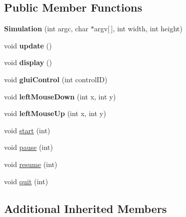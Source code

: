 \subsection*{Public Member Functions}
\begin{DoxyCompactItemize}
\item 
\hypertarget{classSimulation_a4c669ceaa34c7130966ce45f9de75fbe}{{\bfseries Simulation} (int argc, char $\ast$argv\mbox{[}$\,$\mbox{]}, int width, int height)}\label{classSimulation_a4c669ceaa34c7130966ce45f9de75fbe}

\item 
\hypertarget{classSimulation_a05f768b6836615170f1c43c6c0787fe8}{void {\bfseries update} ()}\label{classSimulation_a05f768b6836615170f1c43c6c0787fe8}

\item 
\hypertarget{classSimulation_a449dcb7d97dfba99efe770de2f399c31}{void {\bfseries display} ()}\label{classSimulation_a449dcb7d97dfba99efe770de2f399c31}

\item 
\hypertarget{classSimulation_a1607cd18e552ab9f4a6f57d362f7121a}{void {\bfseries glui\-Control} (int control\-I\-D)}\label{classSimulation_a1607cd18e552ab9f4a6f57d362f7121a}

\item 
\hypertarget{classSimulation_a786d1ba31d29937f0ac6f3ea88f8a607}{void {\bfseries left\-Mouse\-Down} (int x, int y)}\label{classSimulation_a786d1ba31d29937f0ac6f3ea88f8a607}

\item 
\hypertarget{classSimulation_a62ef254d85017074cd521a5787b5a234}{void {\bfseries left\-Mouse\-Up} (int x, int y)}\label{classSimulation_a62ef254d85017074cd521a5787b5a234}

\item 
void \hyperlink{classSimulation_adaf59b9b5a544f6214d636632a16d6d4}{start} (int)
\item 
void \hyperlink{classSimulation_a72676ce712a367d4124bf88f4165b7b7}{pause} (int)
\item 
void \hyperlink{classSimulation_aecfee72e6cd12d7b2a847a9c9b0634ec}{resume} (int)
\item 
void \hyperlink{classSimulation_ae27c94bdc6071db8dad779b4f0a6ebd9}{quit} (int)
\end{DoxyCompactItemize}
\subsection*{Additional Inherited Members}


